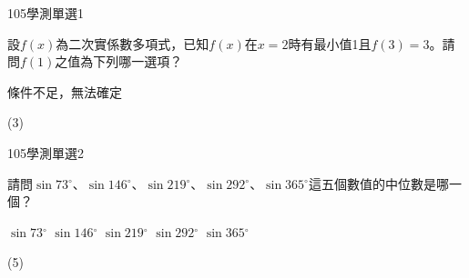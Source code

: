     \begin{QUESTION}
        \begin{ExamInfo}{105}{學測}{單選}{1}
        \end{ExamInfo}
        \begin{ExamAnsRateInfo}{67}{97}{77}{27}
        \end{ExamAnsRateInfo}
        \begin{QBODY}
            設$f(x)$為二次實係數多項式，已知$f(x)$在$x=2$時有最小值1且$f(3)=3$。請問$f(1)$之值為下列哪一選項？
			\begin{QOPS}
				\QOP 條件不足，無法確定
			\end{QOPS}
        \end{QBODY}
        \begin{QFROMS}
        \end{QFROMS}
        \begin{QTAGS}\end{QTAGS}
        \begin{QANS}
            (3)
        \end{QANS}
        \begin{QSOLLIST}
        \end{QSOLLIST}
        \begin{QEMPTYSPACE}
        \end{QEMPTYSPACE}
    \end{QUESTION}
    \begin{QUESTION}
        \begin{ExamInfo}{105}{學測}{單選}{2}
        \end{ExamInfo}
        \begin{ExamAnsRateInfo}{53}{89}{58}{12}
        \end{ExamAnsRateInfo}
        \begin{QBODY}
            請問$\sin 73{}^\circ $、$\sin 146{}^\circ $、$\sin 219{}^\circ $、$\sin 292{}^\circ $、$\sin 365{}^\circ $這五個數值的中位數是哪一個？
			\begin{QOPS}
				\QOP $\sin 73{}^\circ $	
				\QOP $\sin 146{}^\circ $	
				\QOP $\sin 219{}^\circ $
				\QOP $\sin 292{}^\circ $	
				\QOP $\sin 365{}^\circ $
			\end{QOPS}
        \end{QBODY}
        \begin{QFROMS}
        \end{QFROMS}
        \begin{QTAGS}\end{QTAGS}
        \begin{QANS}
            (5)
        \end{QANS}
        \begin{QSOLLIST}
        \end{QSOLLIST}
        \begin{QEMPTYSPACE}
        \end{QEMPTYSPACE}
    \end{QUESTION}
